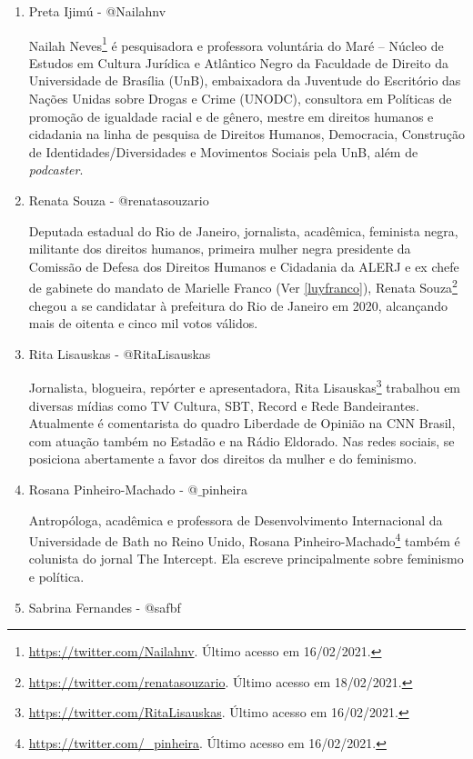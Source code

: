 \documentclass[
	12pt,				%
	openright,			%
	twoside,			%
	a4paper,			%
	english,			%
	brazil				%
	]{abntex2}
\begin{document}
\begin{anexosenv}
\begin{enumerate}
 \item Preta Ijimú - @Nailahnv
 
 Nailah Neves\footnote{\url{https://twitter.com/Nailahnv}. Último acesso em 16/02/2021.} é pesquisadora e professora voluntária do Maré -- Núcleo de Estudos em Cultura Jurídica e Atlântico Negro da Faculdade de Direito da Universidade de Brasília (UnB), embaixadora da Juventude do Escritório das Nações Unidas sobre Drogas e Crime (UNODC), consultora em Políticas de promoção de igualdade racial e de gênero, mestre em direitos humanos e cidadania na linha de pesquisa de Direitos Humanos, Democracia, Construção de Identidades/Diversidades e Movimentos Sociais pela UnB, além de \textit{podcaster}.

 \item Renata Souza - @renatasouzario
 
 Deputada estadual do Rio de Janeiro, jornalista, acadêmica, feminista negra, militante dos direitos humanos, primeira mulher negra presidente da Comissão de Defesa dos Direitos Humanos e Cidadania da ALERJ e ex chefe de gabinete do mandato de Marielle Franco (Ver \ref{luyfranco}), Renata Souza\footnote{\url{https://twitter.com/renatasouzario}. Último acesso em 18/02/2021.} chegou a se candidatar à prefeitura do Rio de Janeiro em 2020, alcançando mais de oitenta e cinco mil votos válidos.

 \item Rita Lisauskas - @RitaLisauskas
 
 Jornalista, blogueira, repórter e apresentadora, Rita Lisauskas\footnote{\url{https://twitter.com/RitaLisauskas}. Último acesso em 16/02/2021.} trabalhou em diversas mídias como TV Cultura, SBT, Record e Rede Bandeirantes. Atualmente é comentarista do quadro Liberdade de Opinião na CNN Brasil, com atuação também no Estadão e na Rádio Eldorado. Nas redes sociais, se posiciona abertamente a favor dos direitos da mulher e do feminismo.

 \item Rosana Pinheiro-Machado - @$\_$pinheira
 
 Antropóloga, acadêmica e professora de Desenvolvimento Internacional da Universidade de Bath no Reino Unido, Rosana Pinheiro-Machado\footnote{\url{https://twitter.com/_pinheira}. Último acesso em 16/02/2021.} também é colunista do jornal The Intercept. Ela escreve principalmente sobre feminismo e política.

 \item Sabrina Fernandes - @safbf\label{sabfer}
 

\end{enumerate}
\end{anexosenv}
\end{document}

